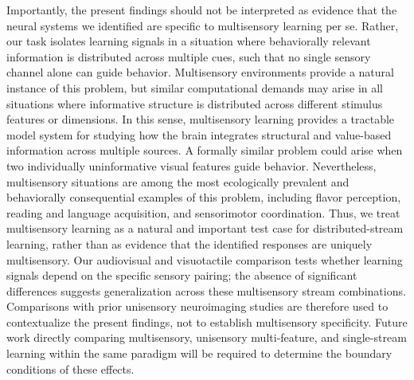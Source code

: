 \documentclass{article}
\begin{document}
Importantly, the present findings should not be interpreted as evidence that the neural systems we identified are specific to multisensory learning per se. Rather, our task isolates learning signals in a situation where behaviorally relevant information is distributed across multiple cues, such that no single sensory channel alone can guide behavior. Multisensory environments provide a natural instance of this problem, but similar computational demands may arise in all situations where informative structure is distributed across different stimulus features or dimensions. In this sense, multisensory learning provides a tractable model system for studying how the brain integrates structural and value-based information across multiple sources. A formally similar problem could arise when two individually uninformative visual features guide behavior. Nevertheless, multisensory situations are among the most ecologically prevalent and behaviorally consequential examples of this problem, including flavor perception, reading and language acquisition, and sensorimotor coordination. Thus, we treat multisensory learning as a natural and important test case for distributed-stream learning, rather than as evidence that the identified responses are uniquely multisensory. Our audiovisual and visuotactile comparison tests whether learning signals depend on the specific sensory pairing; the absence of significant differences suggests generalization across these multisensory stream combinations. Comparisons with prior unisensory neuroimaging studies are therefore used to contextualize the present findings, not to establish multisensory specificity. Future work directly comparing multisensory, unisensory multi-feature, and single-stream learning within the same paradigm will be required to determine the boundary conditions of these effects.\newline
\end{document}
